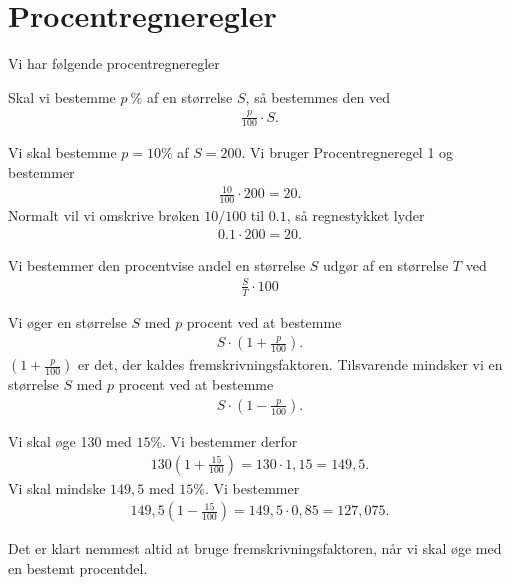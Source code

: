 \section*{Procentregneregler}
Vi har følgende procentregneregler
\begin{regel}[Procentregneregel 1]
Skal vi bestemme $p\ \%$ af en størrelse $S$, så bestemmes den ved 
\begin{align*}
\frac{p}{100}\cdot S.
\end{align*} 
\end{regel}
\begin{exa}
Vi skal bestemme $p=10\%$ af $S=200$. Vi bruger Procentregneregel 1 og bestemmer
\begin{align*}
\frac{10}{100}\cdot 200 = 20. 
\end{align*} 
Normalt vil vi omskrive brøken $10/100$ til $0.1$, så regnestykket lyder
\begin{align*}
0.1\cdot 200 = 20.
\end{align*} 
\end{exa}
\begin{regel}[Procentregneregel 2]
Vi bestemmer den procentvise andel en størrelse $S$ udgør af en størrelse $T$ ved 
\begin{align*}
\frac{S}{T}\cdot 100
\end{align*}
\end{regel}
\begin{regel}[Procentregneregel 3]
Vi øger en størrelse $S$ med $p$ procent ved at bestemme
\begin{align*}
S\cdot(1+\frac{p}{100}). 
\end{align*}
$(1+\frac{p}{100})$ er det, der kaldes fremskrivningsfaktoren. 
Tilsvarende mindsker vi en størrelse $S$ med $p$ procent ved at bestemme
\begin{align*}
S \cdot (1-\frac{p}{100}).
\end{align*}
\end{regel}
\begin{exa}
Vi skal øge 130 med $15 \%$. Vi bestemmer derfor 
\begin{align*}
130 (1+\frac{15}{100}) = 130\cdot 1,15 = 149,5.
\end{align*}
Vi skal mindske $149,5$ med $15 \%$. Vi bestemmer
\begin{align*}
149,5(1-\frac{15}{100}) = 149,5\cdot 0,85 = 127,075.
\end{align*}
\end{exa}
Det er klart nemmest altid at bruge fremskrivningsfaktoren, når vi skal øge med en bestemt procentdel. 

